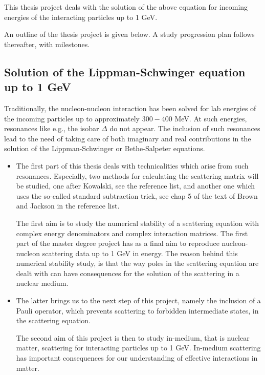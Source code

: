 This thesis project deals with the solution of the above equation
for incoming energies of the interacting particles up to
1 GeV.

An outline of the thesis project is given below.
A study progression plan follows thereafter, with milestones.



\subsection*{Solution of the Lippman-Schwinger equation up to 1 GeV}
Traditionally, the nucleon-nucleon interaction has been solved 
for lab energies of the incoming particles up to approximately
$300-400$ MeV. At such energies, resonances like e.g., the isobar
$\Delta $ do not appear. 
The inclusion of such resonances lead to the need of taking care of
both imaginary and real contributions in the solution of the
Lippman-Schwinger or Bethe-Salpeter equations.  

\begin{itemize}
\item The first part of this thesis deals with technicalities which arise
from such resonances. Especially, two methods for calculating the 
scattering matrix will be studied, one after Kowalski, see the reference
list, and another one which uses the so-called standard subtraction
trick, see chap 5 of the text of Brown and Jackson in the reference list.

The first aim is to study the numerical stability of a scattering equation
with complex energy denominators and complex interaction
matrices. 
The first part of the master degree project has as a final aim to
reproduce nucleon-nucleon scattering data up to 1 GeV in energy.
The reason behind this numerical stability study, is that the way poles
in the scattering equation are dealt with can have consequences 
for the solution of the scattering in a nuclear medium.

\item
The latter brings us to the next step of this project, namely the inclusion
of a Pauli operator, which prevents scattering  to forbidden intermediate
states, in the scattering equation. 


The second aim of this project is then to study in-medium, that is
nuclear matter, scattering for interacting particles up to 1 GeV.
In-medium scattering has important consequences for our understanding
of effective interactions in matter.
\end{itemize}


